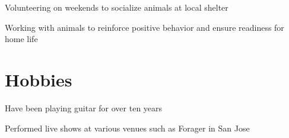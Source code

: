 \documentclass[letterpaper]{resume-shreeram}
\begin{document}
\begin{compactitem}
  \item Volunteering on weekends to socialize animals at local shelter

  \item Working with animals to reinforce positive behavior and ensure
    readiness for home life
\end{compactitem}


\section{Hobbies}

\begin{compactitem}
  \item Have been playing guitar for over ten years

  \item Performed live shows at various venues such as Forager in San
    Jose
\end{compactitem}
\end{document}
